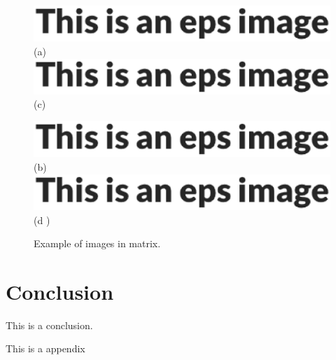 \documentclass{article}
\begin{document}
    \begin{figure}[htbp] %
        \centering
        \begin{minipage}[htb]{0.45\linewidth} %
            \centering
            \includegraphics[width=\linewidth]{example.eps}
            (a)
            \includegraphics[width=\linewidth]{example.eps}
            (c)
        \end{minipage}
        \begin{minipage}[htb]{0.45\linewidth}
            \centering
            \includegraphics[width=\linewidth]{example.eps}
            (b)
            \includegraphics[width=\linewidth]{example.eps}
            (d )
        \end{minipage}
        \caption{Example of images in matrix.}
        \label{fig_3}
    \end{figure}


    \section{Conclusion}
    This is a conclusion.
    
    
    \appendixpage %
    \appendix
    This is a appendix

    
    
\end{document}
